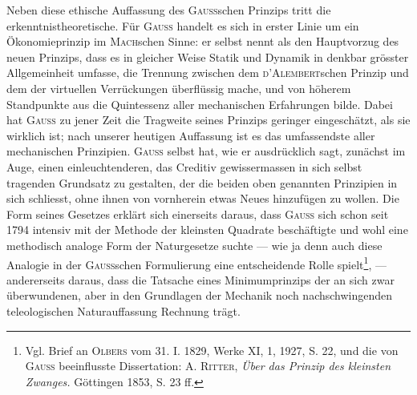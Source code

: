 Neben diese ethische Auffassung des \textsc{Gauss}schen Prinzips tritt die erkenntnistheoretische.
Für \textsc{Gauss} handelt es sich in erster Linie um ein Ökonomieprinzip
im \textsc{Mach}schen Sinne: er selbst nennt als den Hauptvorzug des
neuen Prinzips, dass es in gleicher Weise Statik und Dynamik in denkbar
grösster Allgemeinheit umfasse, die Trennung zwischen dem \textsc{d’Alembert}schen
Prinzip und dem der virtuellen Verrückungen überflüssig mache, und von
höherem Standpunkte aus die Quintessenz aller mechanischen Erfahrungen
bilde. Dabei hat \textsc{Gauss} zu jener Zeit die Tragweite seines Prinzips geringer
eingeschätzt, als sie wirklich ist; nach unserer heutigen Auffassung ist es das
umfassendste aller mechanischen Prinzipien. \textsc{Gauss} selbst hat, wie er ausdrücklich
sagt, zunächst im Auge, einen einleuchtenderen, das Creditiv gewissermassen
in sich selbst tragenden Grundsatz zu gestalten, der die beiden
oben genannten Prinzipien in sich schliesst, ohne ihnen von vornherein etwas
Neues hinzufügen zu wollen. Die Form seines Gesetzes erklärt sich einerseits
daraus, dass \textsc{Gauss} sich schon seit 1794 intensiv mit der Methode der kleinsten
Quadrate beschäftigte und wohl eine methodisch analoge Form der Naturgesetze
suchte — wie ja denn auch diese Analogie in der \textsc{Gauss}schen Formulierung
eine entscheidende Rolle spielt\footnote{Vgl. Brief an \textsc{Olbers} vom 31. I. 1829, Werke XI, 1, 1927, S. 22, und die von \textsc{Gauss} beeinflusste
Dissertation: A. \textsc{Ritter}, \textit{Über das Prinzip des kleinsten Zwanges.} Göttingen 1853, S. 23 ff.}, — andererseits daraus, dass die
Tatsache eines Minimumprinzips der an sich zwar überwundenen, aber in den
Grundlagen der Mechanik noch nachschwingenden teleologischen Naturauffassung
Rechnung trägt.


